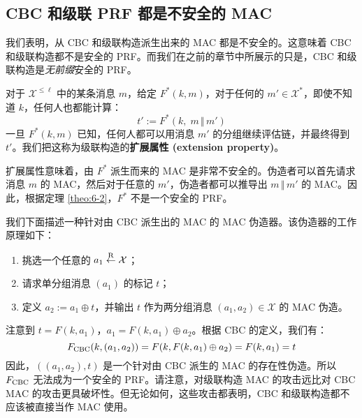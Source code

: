 \subsection{CBC 和级联 PRF 都是不安全的 MAC}\label{subsec:6-4-3}

我们表明，从 CBC 和级联构造派生出来的 MAC 都是不安全的。这意味着 CBC 和级联构造都不是安全的 PRF。而我们在之前的章节中所展示的只是，CBC 和级联构造是\emph{无前缀}安全的 PRF。

\begin{snote}[对级联构造的扩展攻击。]
对于 $\mathcal{X}^{\leq\ell}$ 中的某条消息 $m$，给定 $F^*(k,m)$，对于任何的 $m'\in\mathcal{X}^*$，即使不知道 $k$，任何人也都能计算：
\begin{equation}\label{eq:6-16}
t':=F^*(k,\;m\,\Vert\,m')
\end{equation}
一旦 $F^*(k,m)$ 已知，任何人都可以用消息 $m'$ 的分组继续评估链，并最终得到 $t'$。我们把这称为级联构造的\textbf{扩展属性 (extension property)}。

扩展属性意味着，由 $F^*$ 派生而来的 MAC 是非常不安全的。伪造者可以首先请求消息 $m$ 的 MAC，然后对于任意的 $m'$，伪造者都可以推导出 $m\,\Vert\,m'$ 的 MAC。因此，根据定理 \ref{theo:6-2}，$F^*$ 不是一个安全的 PRF。
\end{snote}

\begin{snote}
我们下面描述一种针对由 CBC 派生出的 MAC 的 MAC 伪造器。该伪造器的工作原理如下：
\begin{enumerate}
	\item 挑选一个任意的 $a_1\overset{\rm R}\leftarrow\mathcal{X}$；
	\item 请求单分组消息 $(a_1)$ 的标记 $t$；
	\item 定义 $a_2:=a_1\oplus t$，并输出 $t$ 作为两分组消息 $(a_1,a_2)\in\mathcal{X}$ 的 MAC 伪造。
\end{enumerate}
注意到 $t=F(k,a_1)$，$a_1=F(k,a_1)\oplus a_2$。根据 CBC 的定义，我们有：
\[
F_{\rm CBC}(k,(a_1,a_2))=F(k,F(k,a_1)\oplus a_2)=F(k,a_1)=t
\]
因此，$((a_1,a_2),t)$  是一个针对由 CBC 派生的 MAC 的存在性伪造。所以 $F_{\rm CBC}$ 无法成为一个安全的 PRF。请注意，对级联构造 MAC 的攻击远比对 CBC MAC 的攻击更具破坏性。但无论如何，这些攻击都表明，CBC 和级联构造都不应该被直接当作 MAC 使用。
\end{snote}